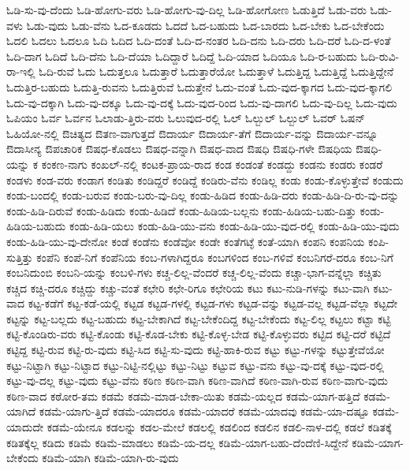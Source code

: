 {ಓಡಿ-ಸು-ವು-ದೆಂದು
ಓಡಿ-ಹೋಗು-ವರು
ಓಡಿ-ಹೋಗು-ವು-ದಿಲ್ಲ
ಓಡಿ-ಹೋಗೋಣ
ಓಡುತ್ತಿದೆ
ಓಡು-ವರು
ಓಡು-ವಳು
ಓಡು-ವುದು
ಓಡು-ವೆನು
ಓದ-ಕೂಡದು
ಓದದೆ
ಓದ-ಬಹುದು
ಓದ-ಬಾರದು
ಓದ-ಬೇಕು
ಓದ-ಬೇಕೆಂದು
ಓದಲಿ
ಓದಲು
ಓದಲೂ
ಓದಿ
ಓದಿದ
ಓದಿ-ದಂತೆ
ಓದಿ-ದ-ನಂತರ
ಓದಿ-ದನು
ಓದಿ-ದರು
ಓದಿ-ದರೆ
ಓದಿ-ದ-ಳಂತೆ
ಓದಿ-ದಾಗ
ಓದಿದೆ
ಓದಿ-ದೆನು
ಓದಿ-ದೆಯಾ
ಓದಿದ್ದಾರೆ
ಓದಿದ್ದೆ
ಓದಿ-ಯಾದ
ಓದಿಯೂ
ಓದಿ-ರ-ಬಹುದು
ಓದಿ-ರುವಿ-ರಾ-ಇಲ್ಲಿ
ಓದಿ-ರುವೆ
ಓದು
ಓದುತ್ತಲೂ
ಓದುತ್ತಾರೆ
ಓದುತ್ತಾರೆಯೋ
ಓದುತ್ತಾಳೆ
ಓದುತ್ತಿದ್ದ
ಓದುತ್ತಿದ್ದೆ
ಓದುತ್ತಿದ್ದೇನೆ
ಓದುತ್ತಿರ-ಬಹುದು
ಓದುತ್ತಿ-ರುವನು
ಓದುತ್ತಿರುವೆ
ಓದುತ್ತೇನೆ
ಓದು-ವಂತೆ
ಓದು-ವುದ-ಕ್ಕಾಗದ
ಓದು-ವುದ-ಕ್ಕಾಗಲಿ
ಓದು-ವು-ದಕ್ಕಾಗಿ
ಓದು-ವು-ದಕ್ಕೂ
ಓದು-ವು-ದಕ್ಕೆ
ಓದು-ವುದ-ರಿಂದ
ಓದು-ವು-ದಾಗಲಿ
ಓದು-ವು-ದಿಲ್ಲ
ಓದು-ವುದು
ಓಪಿಯಂ
ಓರ್ವ
ಓರ್ವನ
ಓಲಾಡು-ತ್ತಿರು-ವರು
ಓಲುವುದ-ರಲ್ಲಿ
ಓಲ್
ಓಲ್ಬುಲ್
ಓಲ್ಬುಲ್
ಓವರ್
ಓಷನ್
ಓಹಿಯೋ-ನಲ್ಲಿ
ಔಚಿತ್ಯದ
ಔತಣ-ವಾಗುತ್ತದೆ
ಔದಾರ್ಯ
ಔದಾರ್ಯ-ತೆಗೆ
ಔದಾರ್ಯ-ವನ್ನು
ಔದಾರ್ಯ-ವನ್ನೂ
ಔದಾಸೀನ್ಯ
ಔಪಚಾರಿಕ
ಔಷಧ-ಕೊಡಲು
ಔಷಧ-ವನ್ನಾಗಿ
ಔಷಧ-ವಾದ
ಔಷಧಿ
ಔಷಧಿ-ಗಳೇ
ಔಷಧಿಯ
ಔಷಧಿ-ಯನ್ನು
ಕ
ಕಂಕಣ-ನಾಗು
ಕಂಖಲ್-ನಲ್ಲಿ
ಕಂಟಕ-ಪ್ರಾಯ-ರಾದ
ಕಂಡ
ಕಂಡಂತೆ
ಕಂಡದ್ದು
ಕಂಡನು
ಕಂಡರು
ಕಂಡರೆ
ಕಂಡಳು
ಕಂಡ-ವರು
ಕಂಡಾಗ
ಕಂಡಿತು
ಕಂಡಿದ್ದರೆ
ಕಂಡಿದ್ದೆ
ಕಂಡಿರು-ವೆನು
ಕಂಡಿಲ್ಲ
ಕಂಡು
ಕಂಡು-ಕೊಳ್ಳುತ್ತೇವೆ
ಕಂಡುದು
ಕಂಡು-ಬಂದಲ್ಲಿ
ಕಂಡು-ಬರುವ
ಕಂಡು-ಬರು-ವು-ದಿಲ್ಲ
ಕಂಡು-ಹಿಡಿದ
ಕಂಡು-ಹಿಡಿ-ದರು
ಕಂಡು-ಹಿಡಿ-ದಿ-ರು-ವು-ದನ್ನು
ಕಂಡು-ಹಿಡಿ-ದಿರುವೆ
ಕಂಡು-ಹಿಡಿದು
ಕಂಡು-ಹಿಡಿದೆ
ಕಂಡು-ಹಿಡಿಯ-ಬಲ್ಲನು
ಕಂಡು-ಹಿಡಿಯ-ಬಹು-ದಿತ್ತು
ಕಂಡು-ಹಿಡಿಯ-ಬಹುದು
ಕಂಡು-ಹಿಡಿ-ಯಲು
ಕಂಡು-ಹಿಡಿ-ಯು-ವನು
ಕಂಡು-ಹಿಡಿ-ಯು-ವುದ-ರಲ್ಲಿ
ಕಂಡು-ಹಿಡಿ-ಯು-ವುದು
ಕಂಡು-ಹಿಡಿ-ಯು-ವು-ದೇನೋ
ಕಂಡೆ
ಕಂಡೆನು
ಕಂಡೆವೋ
ಕಂಡೇ
ಕಂತೆಗಟ್ಳೆ
ಕಂತೆ-ಯಾಗಿ
ಕಂಪನಿ
ಕಂಪನಿಯ
ಕಂಪಿ-ಸುತ್ತಿತ್ತು
ಕಂಪೆನಿ
ಕಂಪೆ-ನಿಗೆ
ಕಂಪೆನಿಯ
ಕಂಬ-ಗಳಾಗಿದ್ದರೂ
ಕಂಬಗಳಿಂದ
ಕಂಬ-ಗಳಿವೆ
ಕಂಬನಿಗರೆ-ದರೂ
ಕಂಬ-ನಿಗೆ
ಕಂಬನಿದುಂಬಿ
ಕಂಬನಿ-ಯನ್ನು
ಕಂಬಳಿ-ಗಳು
ಕಚ್ಚ-ಲಿಲ್ಲ-ವೆಂದರೆ
ಕಚ್ಚ-ಲಿಲ್ಲ-ವೆಂದು
ಕಚ್ಚಾ-ಭಾಗ-ವನ್ನೆಲ್ಲಾ
ಕಚ್ಚಿತು
ಕಚ್ಚಿದ
ಕಚ್ಚಿ-ದರೂ
ಕಚ್ಚಿದ್ದು
ಕಚ್ಚು-ವಂತೆ
ಕಛೇರಿ
ಕಛೇ-ರಿಗೂ
ಕಛೇರಿಯ
ಕಟು
ಕಟು-ನುಡಿ-ಗಳನ್ನು
ಕಟು-ವಾಗಿ
ಕಟು-ವಾದ
ಕಟ್ಟ-ಕಡೆಗೆ
ಕಟ್ಟ-ಕಡೆ-ಯಲ್ಲಿ
ಕಟ್ಟಡ
ಕಟ್ಟಡ-ಗಳಲ್ಲಿ
ಕಟ್ಟಡ-ಗಳು
ಕಟ್ಟಡ-ವನ್ನು
ಕಟ್ಟಡ-ವಲ್ಲ
ಕಟ್ಟಡ-ವೆಲ್ಲಾ
ಕಟ್ಟದೇ
ಕಟ್ಟನ್ನು
ಕಟ್ಟ-ಬಲ್ಲದು
ಕಟ್ಟ-ಬಹುದು
ಕಟ್ಟ-ಬೇಕಾಗಿದೆ
ಕಟ್ಟ-ಬೇಕೆಂದಿದ್ದ
ಕಟ್ಟ-ಬೇಕೆಂದು
ಕಟ್ಟ-ಲಿಲ್ಲ
ಕಟ್ಟಲು
ಕಟ್ಟಾ
ಕಟ್ಟಿ
ಕಟ್ಟಿ-ಕೊಂಡಿರು-ವರು
ಕಟ್ಟಿ-ಕೊಂಡು
ಕಟ್ಟಿ-ಕೊಡ-ಬೇಕು
ಕಟ್ಟಿ-ಕೊಳ್ಳ-ಬೇಡ
ಕಟ್ಟಿ-ಕೊಳ್ಳುವರು
ಕಟ್ಟಿದ
ಕಟ್ಟಿ-ದರೆ
ಕಟ್ಟಿದೆ
ಕಟ್ಟಿದ್ದ
ಕಟ್ಟಿ-ರುವ
ಕಟ್ಟಿ-ರು-ವುದು
ಕಟ್ಟಿ-ಸಿದ
ಕಟ್ಟಿ-ಸು-ವುದು
ಕಟ್ಟಿ-ಹಾಕಿ-ರುವ
ಕಟ್ಟು
ಕಟ್ಟು-ಗಳನ್ನು
ಕಟ್ಟುತ್ತೇವೆಯೋ
ಕಟ್ಟು-ನಿಟ್ಟಾಗಿ
ಕಟ್ಟು-ನಿಟ್ಟಾದ
ಕಟ್ಟು-ನಿಟ್ಟಿ-ನಲ್ಲಿಟ್ಟು
ಕಟ್ಟು-ನಿಟ್ಟು
ಕಟ್ಟುವ
ಕಟ್ಟು-ವನು
ಕಟ್ಟು-ವು-ದಕ್ಕೆ
ಕಟ್ಟು-ವುದ-ರಲ್ಲಿ
ಕಟ್ಟು-ವು-ದಲ್ಲ
ಕಟ್ಟು-ವುದು
ಕಟ್ಟು-ವೆನು
ಕಠಿಣ
ಕಠಿಣ-ವಾಗಿ
ಕಠಿಣ-ವಾಗಿದೆ
ಕಠಿಣ-ವಾಗಿ-ರುವ
ಕಠಿಣ-ವಾಗು-ವುದು
ಕಠಿಣ-ವಾದ
ಕಠೋರ-ತಮ
ಕಡಮೆ
ಕಡಮೆ-ಮಾಡ-ಬೇಕಾ-ಯಿತು
ಕಡಮೆ-ಯಲ್ಲದ
ಕಡಮೆ-ಯಾಗ-ಹತ್ತಿದೆ
ಕಡಮೆ-ಯಾಗಿದೆ
ಕಡಮೆ-ಯಾಗು-ತ್ತಿದೆ
ಕಡಮೆ-ಯಾದರೂ
ಕಡಮೆ-ಯಾದರೆ
ಕಡಮೆ-ಯಾದವು
ಕಡಮೆ-ಯಾ-ದಷ್ಟೂ
ಕಡಮೆ-ಯಾದುದೇ
ಕಡಮೆ-ಯೇನೂ
ಕಡಲನ್ನು
ಕಡಲ-ಮೇಲೆ
ಕಡಲಲ್ಲಿ
ಕಡಲಿಂದ
ಕಡಲಿನ
ಕಡಲಿ-ನಾಳ-ದಲ್ಲಿ
ಕಡಲೆ
ಕಡಿತಕ್ಕೆ
ಕಡಿತಕ್ಕೆಲ್ಲ
ಕಡಿದು
ಕಡಿಮೆ
ಕಡಿಮೆ-ಮಾಡಲು
ಕಡಿಮೆ-ಯ-ದಲ್ಲ
ಕಡಿಮೆ-ಯಾಗ-ಬಹು-ದೆಂದೆಣಿ-ಸಿದ್ದೇನೆ
ಕಡಿಮೆ-ಯಾಗ-ಬೇಕೆಂದು
ಕಡಿಮೆ-ಯಾಗಿ
ಕಡಿಮೆ-ಯಾಗಿ-ರು-ವುದು
}
